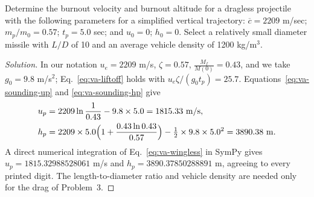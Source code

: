 \begin{exercise}
Determine the burnout velocity and burnout altitude for a dragless
projectile with the following parameters for a simplified vertical
trajectory: $\overline{c}=2209$ m/sec; $m_p/m_0=0.57$; $t_p=5.0$ sec; and
$u_0=0$; $h_0=0$. Select a relatively small diameter missile with $L/D$ of
10 and an average vehicle density of 1200 kg/m$^3$.
\end{exercise}
\begin{proof}[Solution]
In our notation $u_e=2209$ m/s, $\zeta=0.57$, $\frac{M_f}{M(0)}=0.43$, and we take
$g_0=9.8$ m/s$^2$; Eq.~\ref{eq:va-liftoff} holds with
$u_e\zeta/(g_0t_p)=25.7$. Equations~\ref{eq:va-sounding-up} and
\ref{eq:va-sounding-hp} give
\[
\begin{aligned}
 u_p&=2209\ln\frac1{0.43}-9.8\times5.0=1815.33\ \mathrm{m/s},\\
 h_p&=2209\times5.0\Bigl(1+\frac{0.43\ln0.43}{0.57}\Bigr)
      -\tfrac12\times9.8\times5.0^2=3890.38\ \mathrm{m}.
\end{aligned}
\]
A direct numerical integration of Eq.~\ref{eq:va-wingless} in SymPy gives
$u_p=1815.32988528061$ m/s and $h_p=3890.37850288891$ m, agreeing to every
printed digit. The length-to-diameter ratio and vehicle density are needed
only for the drag of Problem~3.
\end{proof}

